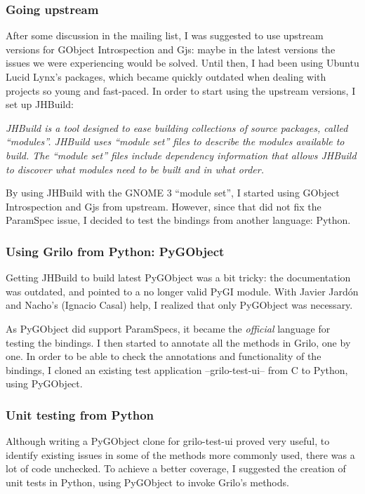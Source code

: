 \subsubsection{Going upstream}

After some discussion in the mailing list, I was suggested to use upstream versions
for GObject Introspection and Gjs: maybe in the latest versions the issues we were
experiencing would be solved. Until then, I had been using Ubuntu Lucid Lynx's packages,
which became quickly outdated when dealing with projects so young and fast-paced.
In order to start using the upstream versions, I set up JHBuild:

{\it JHBuild is a tool designed to ease building collections of source packages,
called ``modules''. JHBuild uses ``module set'' files to describe the modules available
to build. The ``module set'' files include dependency information that allows JHBuild
to discover what modules need to be built and in what order.}

By using JHBuild with the GNOME 3 ``module set'', I started using GObject Introspection and
Gjs from upstream. However, since that did not fix the ParamSpec issue, I decided to test
the bindings from another language: Python.

\subsubsection{Using Grilo from Python: PyGObject}

Getting JHBuild to build latest PyGObject was a bit tricky: the documentation was
outdated, and pointed to a no longer valid PyGI module. With Javier Jard\'on and Nacho's
(Ignacio Casal) help, I realized that only PyGObject was necessary.

As PyGObject did support ParamSpecs, it became the {\it official} language for testing
the bindings. I then started to annotate all the methods in Grilo, one by one. In order
to be able to check the annotations and functionality of the bindings, I cloned
an existing test application --grilo-test-ui-- from C to Python, using PyGObject.

\subsubsection{Unit testing from Python}

Although writing a PyGObject clone for grilo-test-ui proved very useful, to identify
existing issues in some of the methods more commonly used, there was a lot of code
unchecked. To achieve a better coverage, I suggested the creation of unit tests in
Python, using PyGObject to invoke Grilo's methods.

